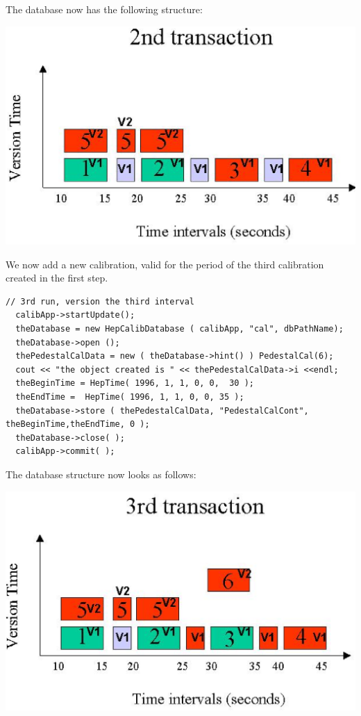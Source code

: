 \par

The database now has the following structure:
\par

\includegraphics[width=.7\linewidth, scale=.5]{trans2}

\par

We now add a new calibration, valid for the period of the third calibration
created in the first step.
\begin{verbatim}
// 3rd run, version the third interval 
  calibApp->startUpdate(); 
  theDatabase = new HepCalibDatabase ( calibApp, "cal", dbPathName); 
  theDatabase->open (); 
  thePedestalCalData = new ( theDatabase->hint() ) PedestalCal(6); 
  cout << "the object created is " << thePedestalCalData->i <<endl; 
  theBeginTime = HepTime( 1996, 1, 1, 0, 0,  30 ); 
  theEndTime =  HepTime( 1996, 1, 1, 0, 0, 35 ); 
  theDatabase->store ( thePedestalCalData, "PedestalCalCont", theBeginTime,theEndTime, 0 ); 
  theDatabase->close( ); 
  calibApp->commit( ); 
\end{verbatim}

\par

The database structure now looks as follows:
\par

\includegraphics[width=.7\linewidth, scale=.5]{trans3}

